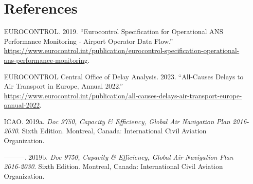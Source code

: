 \documentclass[
  a4paper,
  DIV=11,
  numbers=noendperiod]{scrreport}
\newlength{\cslhangindent}
\newlength{\cslentryspacingunit} %
\newenvironment{CSLReferences}[2] %
 {%
  \setlength{\parindent}{0pt}
  \ifodd #1
  \let\oldpar\par
  \def\par{\hangindent=\cslhangindent\oldpar}
  \fi
  \setlength{\parskip}{#2\cslentryspacingunit}
 }%
 {}
\begin{document}

\hypertarget{references}{%
\chapter*{References}\label{references}}


\hypertarget{refs}{}
\begin{CSLReferences}{1}{0}
\leavevmode{}%
EUROCONTROL. 2019. {``Eurocontrol {Specification} for {Operational ANS
Performance Monitoring} - {Airport Operator Data Flow}.''}
\url{https://www.eurocontrol.int/publication/eurocontrol-specification-operational-ans-performance-monitoring}.

\leavevmode{}%
EUROCONTROL Central Office of Delay Analysis. 2023. {``All-Causes Delays
to Air Transport in Europe, Annual 2022.''}
\url{https://www.eurocontrol.int/publication/all-causes-delays-air-transport-europe-annual-2022}.

\leavevmode{}%
ICAO. 2019a. \emph{Doc 9750, Capacity \& Efficiency, Global Air
Navigation Plan 2016-2030}. Sixth Edition. Montreal, Canada:
International Civil Aviation Organization.

\leavevmode{}%
---------. 2019b. \emph{Doc 9750, Capacity \& Efficiency, Global Air
Navigation Plan 2016-2030}. Sixth Edition. Montreal, Canada:
International Civil Aviation Organization.

\end{CSLReferences}
\end{document}
